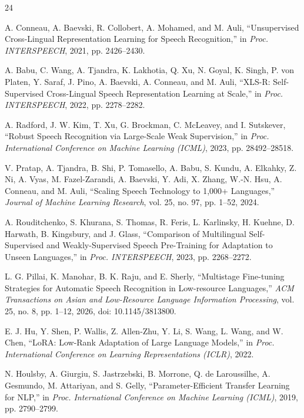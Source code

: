 \documentclass[conference]{IEEEtran}
\begin{document}
\begin{thebibliography}{24}

A. Conneau, A. Baevski, R. Collobert, A. Mohamed, and M. Auli,
``Unsupervised Cross-Lingual Representation Learning for Speech
Recognition,'' in \emph{Proc. INTERSPEECH}, 2021, pp. 2426--2430.

A. Babu, C. Wang, A. Tjandra, K. Lakhotia, Q. Xu, N. Goyal,
K. Singh, P. von Platen, Y. Saraf, J. Pino, A. Baevski, A. Conneau, and
M. Auli, ``XLS-R: Self-Supervised Cross-Lingual Speech Representation
Learning at Scale,'' in \emph{Proc. INTERSPEECH}, 2022, pp. 2278--2282.

A. Radford, J. W. Kim, T. Xu, G. Brockman, C. McLeavey, and
I. Sutskever, ``Robust Speech Recognition via Large-Scale Weak
Supervision,'' in \emph{Proc. International Conference on Machine
Learning (ICML)}, 2023, pp. 28492--28518.

V. Pratap, A. Tjandra, B. Shi, P. Tomasello, A. Babu, S. Kundu,
A. Elkahky, Z. Ni, A. Vyas, M. Fazel-Zarandi, A. Baevski, Y. Adi,
X. Zhang, W.-N. Hsu, A. Conneau, and M. Auli, ``Scaling Speech
Technology to 1{,}000+ Languages,'' \emph{Journal of Machine Learning
Research}, vol. 25, no. 97, pp. 1--52, 2024.

A. Rouditchenko, S. Khurana, S. Thomas, R. Feris, L. Karlinsky,
H. Kuehne, D. Harwath, B. Kingsbury, and J. Glass, ``Comparison of
Multilingual Self-Supervised and Weakly-Supervised Speech Pre-Training
for Adaptation to Unseen Languages,'' in \emph{Proc. INTERSPEECH}, 2023,
pp. 2268--2272.

L. G. Pillai, K. Manohar, B. K. Raju, and E. Sherly, ``Multistage
Fine-tuning Strategies for Automatic Speech Recognition in Low-resource
Languages,'' \emph{ACM Transactions on Asian and Low-Resource Language
Information Processing}, vol. 25, no. 8, pp. 1--12, 2026,
doi: 10.1145/3813800.

E. J. Hu, Y. Shen, P. Wallis, Z. Allen-Zhu, Y. Li, S. Wang, L. Wang, and
W. Chen, ``LoRA: Low-Rank Adaptation of Large Language Models,'' in
\emph{Proc. International Conference on Learning Representations
(ICLR)}, 2022.

N. Houlsby, A. Giurgiu, S. Jastrzebski, B. Morrone, Q. de Laroussilhe,
A. Gesmundo, M. Attariyan, and S. Gelly, ``Parameter-Efficient Transfer
Learning for NLP,'' in \emph{Proc. International Conference on Machine
Learning (ICML)}, 2019, pp. 2790--2799.


\end{thebibliography}
\end{document}
